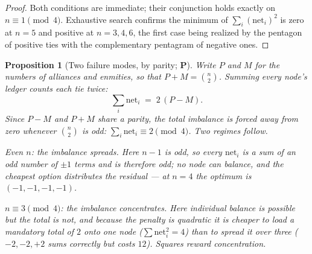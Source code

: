 \documentclass[11pt]{article}
\numberwithin{equation}{section}
\theoremstyle{plain}
\newtheorem{proposition}[theorem]{Proposition}
\theoremstyle{definition}
\theoremstyle{remark}
\begin{document}
\begin{proof}
Both conditions are immediate; their conjunction holds exactly on
$n\equiv1\pmod4$. Exhaustive search confirms the minimum of
$\sum_i(\text{net}_i)^2$ is zero at $n=5$ and positive at
$n=3,4,6$, the first case being realized by the pentagon of positive
ties with the complementary pentagram of negative ones.
\end{proof}

\begin{proposition}[Two failure modes, by parity; \textbf{P}]
\label{ad:prop:parity}
Write $P$ and $M$ for the numbers of alliances and enmities, so that
$P+M=\binom n2$. Summing every node's ledger counts each tie twice:
\begin{equation}\label{ad:eq:parity}
\sum_i \mathrm{net}_i \;=\; 2\,(P-M).
\end{equation}
Since $P-M$ and $P+M$ share a parity, the total imbalance is
\emph{forced} away from zero whenever $\binom n2$ is odd:
$\sum_i\mathrm{net}_i\equiv2\pmod 4$. Two regimes follow.

\emph{Even $n$: the imbalance spreads.} Here $n-1$ is odd, so every
$\mathrm{net}_i$ is a sum of an odd number of $\pm1$ terms and is
therefore odd; \emph{no} node can balance, and the cheapest option
distributes the residual --- at $n=4$ the optimum is $(-1,-1,-1,-1)$.

\emph{$n\equiv3\pmod4$: the imbalance concentrates.} Here individual
balance is possible but the total is not, and because the penalty is
\emph{quadratic} it is cheaper to load a mandatory total of $2$ onto one
node ($\sum\mathrm{net}_i^2=4$) than to spread it over three
($-2,-2,+2$ sums correctly but costs $12$). Squares reward
concentration.
\end{proposition}
\end{document}
